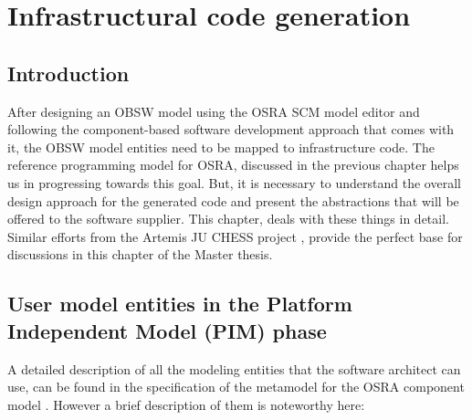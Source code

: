 
\chapter{Infrastructural code generation}
\label{chap: Code generation}
\section{Introduction}
After designing an OBSW model using the OSRA SCM model editor and following the component-based software development approach that comes with it, the OBSW model entities need to be mapped to infrastructure code. The reference programming model for OSRA, discussed in the previous chapter helps us in progressing towards this goal. But, it is necessary to understand the overall design approach for the generated code and present the abstractions that will be offered to the software supplier. This chapter, deals with these things in detail. Similar efforts from the Artemis JU CHESS project \cite{EvoRAVCodeAr}, provide the perfect base for discussions in this chapter of the Master thesis.   

\section{User model entities in the Platform Independent Model (PIM) phase}
A detailed description of all the modeling entities that the software architect can use, can be found in the specification of the metamodel for the OSRA component model \cite{SpecMetamodel}. However a brief description of them is noteworthy here:
 
